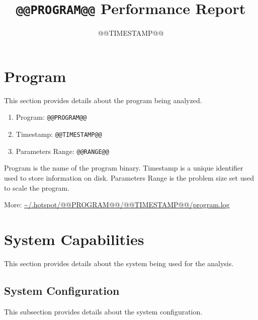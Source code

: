 \documentclass[a4paper]{article}
\begin{document}
\title{{\tt @@PROGRAM@@} Performance Report}

\date{@@TIMESTAMP@@}
\author{}

\maketitle


\tableofcontents

\section{Program}

This section provides details about the program being analyzed.

\begin{enumerate}
\item Program: {\tt @@PROGRAM@@}
\item Timestamp: {\tt @@TIMESTAMP@@}
\item Parameters Range: {\tt @@RANGE@@}
\end{enumerate}

Program is the name of the program binary.
Timestamp is a unique identifier used to store information on disk.
Parameters Range is the problem size set used to scale the program. 

More: \url{~/.hotspot/@@PROGRAM@@/@@TIMESTAMP@@/program.log}

\section{System Capabilities}

This section provides details about the system being used for the analysis.

\subsection{System Configuration}

This subsection provides details about the system configuration.
\end{document}
